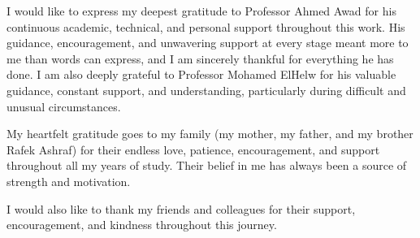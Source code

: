 I would like to express my deepest gratitude to Professor Ahmed Awad for his continuous academic, technical, and personal support throughout this work. His guidance, encouragement, and unwavering support at every stage meant more to me than words can express, and I am sincerely thankful for everything he has done.
I am also deeply grateful to Professor Mohamed ElHelw for his valuable guidance, constant support, and understanding, particularly during difficult and unusual circumstances.

My heartfelt gratitude goes to my family (my mother, my father, and my brother Rafek Ashraf) for their endless love, patience, encouragement, and support throughout all my years of study. Their belief in me has always been a source of strength and motivation.

I would also like to thank my friends and colleagues for their support, encouragement, and kindness throughout this journey.
